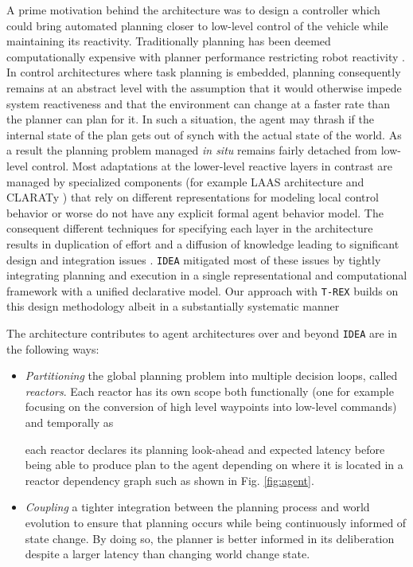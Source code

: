 A prime motivation behind the \rx architecture was to design a
controller which could bring automated planning closer to low-level
control of the vehicle while maintaining its reactivity. Traditionally
planning has been deemed computationally expensive with planner
performance restricting robot reactivity
\cite{ghallab04,Dias:2003ua}. In control architectures where task
planning is embedded, planning consequently remains at an abstract
level with the assumption that it would otherwise impede system
reactiveness and that the environment can change at a faster rate than
the planner can plan for it. In such a situation, the agent may thrash
if the internal state of the plan gets out of synch with the actual
state of the world. As a result the planning problem managed {\em in
  situ} remains fairly detached from low-level control. Most
adaptations at the lower-level reactive layers in contrast are managed
by specialized components (for example LAAS architecture
\cite{alami:1998p820,Ingrand07} and CLARATy \cite{Nesnas:2003do}
) that rely on different representations for modeling local
control behavior or worse do not have any explicit formal agent
behavior model. The consequent different techniques for specifying
each layer in the architecture results in duplication of effort and a
diffusion of knowledge leading to significant design and integration
issues \cite{DS1report}.  \texttt{IDEA} mitigated most of these issues
by tightly integrating planning and execution in a single
representational and computational framework with a unified
declarative model. Our approach with \texttt{T-REX} builds on this
design methodology albeit in a substantially systematic manner

The \rx architecture contributes to agent architectures over and
beyond \texttt{IDEA} are in the following ways:

\begin{itemize}

\item \emph{Partitioning} the global planning problem into multiple
  decision loops, called {\em reactors}. Each reactor has its own
  scope both functionally (one for example focusing on the conversion
  of high level waypoints into low-level commands) and temporally as

  each reactor declares its planning look-ahead and expected latency
  before being able to produce plan to the agent depending on where it
  is located in a reactor dependency graph such as shown in
  Fig. \ref{fig:agent}.

\item \emph{Coupling} a tighter integration between the planning
  process and world evolution to ensure that planning occurs while
  being continuously informed of state change. By doing so, the
  planner is better informed in its deliberation despite a larger
  latency than changing world change state.

\end{itemize}

